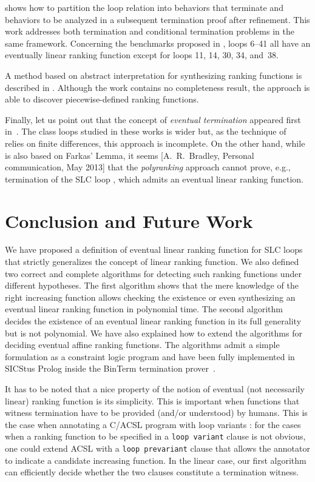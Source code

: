 \documentclass{acm_proc_article-sp}
\begin{document}
\cite{GantyG13} shows how to partition the loop relation into
behaviors that terminate and behaviors to be analyzed in a subsequent
termination proof after refinement.
This work addresses both termination  and  conditional termination problems
in the same framework.
Concerning the benchmarks proposed in \cite[Table~1]{GantyG13},
loops 6--41 all have an eventually linear ranking function except for
loops 11, 14, 30, 34, and~38.

A method based on abstract interpretation for synthesizing
ranking functions is described in \cite{Urban13}.
Although the work contains no completeness result, the approach
is able to discover piecewise-defined ranking functions.

Finally, let us point out that the concept of \emph{eventual termination}
appeared first in~\cite{BradleyMS05ICALP,BradleyMS05VMCAI}.
The class loops studied in these works is wider but,
as the technique of~\cite{BradleyMS05VMCAI} relies on finite differences,
this approach is incomplete.
On the other hand, while \cite{BradleyMS05ICALP} is also based
on Farkas' Lemma, it seems
[A.~R.~Bradley, Personal communication, May 2013]
that the \emph{polyranking} approach cannot
prove, e.g., termination of the SLC loop
, which admits
an eventual linear ranking function.


\section{Conclusion and Future Work}
\label{sec:conclusion-and-future-work}

We have proposed a definition of eventual linear ranking
function for SLC loops that strictly generalizes the concept
of linear ranking function.
We also defined two correct and complete algorithms for detecting such
ranking functions under different hypotheses.
The first algorithm shows that the mere knowledge
of the right increasing function allows checking the existence
or even synthesizing an eventual linear ranking function in polynomial time.
The second algorithm decides the existence of an
eventual linear ranking function in its full generality but
is not polynomial. We have also explained how to extend the algorithms
for deciding eventual affine ranking functions.
The algorithms admit a simple formulation as a constraint logic
program and have been fully implemented in SICStus Prolog inside the
BinTerm termination prover~\cite{SpotoMP10}.

It has to be noted that a nice property of the notion of eventual
(not necessarily linear) ranking function is its simplicity.
This is important when functions that witness termination have to be
provided (and/or understood) by humans.  This is the case when
annotating a C/ACSL program with loop variants \cite{BaudinCFMM+13}:
for the cases when a ranking function to be specified in a
\verb+loop variant+ clause is not obvious, one could extend ACSL with a
\verb+loop prevariant+ clause that allows the annotator
to indicate a candidate increasing function.
In the linear case, our first algorithm can efficiently decide
whether the two clauses constitute a termination witness.
\end{document}
